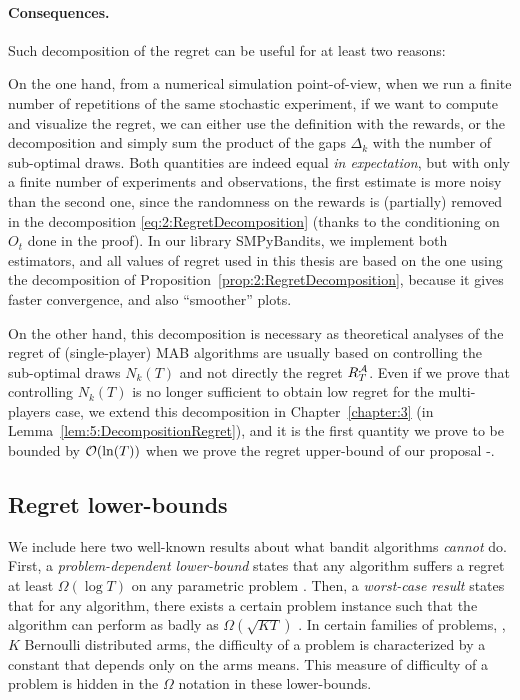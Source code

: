 \paragraph{Consequences.}
%
Such decomposition of the regret can be useful for at least two reasons:

On the one hand, from a numerical simulation point-of-view, when we run a finite number of repetitions of the same stochastic experiment, if we want to compute and visualize the regret, we can either use the definition with the rewards, or the decomposition and simply sum the product of the gaps $\Delta_k$ with the number of sub-optimal draws.
Both quantities are indeed equal \emph{in expectation}, but with only a finite number of experiments and observations, the first estimate is more noisy than the second one, since the randomness on the rewards is (partially) removed in the decomposition \eqref{eq:2:RegretDecomposition} (thanks to the conditioning on $O_t$ done in the proof).
In our library SMPyBandits, we implement both estimators, and all values of regret used in this thesis are based on the one using the decomposition of Proposition~\ref{prop:2:RegretDecomposition}, because it gives faster convergence, and also ``smoother'' plots.
\label{remark:2:moreAccurateCountofRegretForSimulations}

On the other hand, this decomposition is necessary as theoretical analyses of the regret of (single-player) MAB algorithms are usually based on controlling the sub-optimal draws $N_k(T)$ and not directly the regret $R_T^{\mathcal{A}}$.
Even if we prove that controlling $N_k(T)$ is no longer sufficient to obtain low regret for the multi-players case, we extend this decomposition in Chapter~\ref{chapter:3} (in Lemma~\ref{lem:5:DecompositionRegret}), and it is the first quantity we prove to be bounded by $\mathop{}\mathopen{}\mathcal{O}\mathopen{}\left(\ln(T)\right)$ when we prove the regret upper-bound of our proposal \MCTopM-\klUCB.


\subsection{Regret lower-bounds}

We include here two well-known results about what bandit algorithms \emph{cannot} do.
First, a \emph{problem-dependent lower-bound} states that any algorithm suffers a regret at least $\Omega(\log T)$ on any parametric problem \cite{LaiRobbins85}.
Then, a \emph{worst-case result} states that for any algorithm, there exists a certain problem instance such that the algorithm can perform as badly as $\Omega(\sqrt{K T})$  \cite{Auer02NonStochastic}.
%
In certain families of problems, \eg, $K$ Bernoulli distributed arms, the difficulty of a problem is characterized by a constant that depends only on the arms means. This measure of difficulty of a problem is hidden in the $\Omega$ notation in these lower-bounds.


